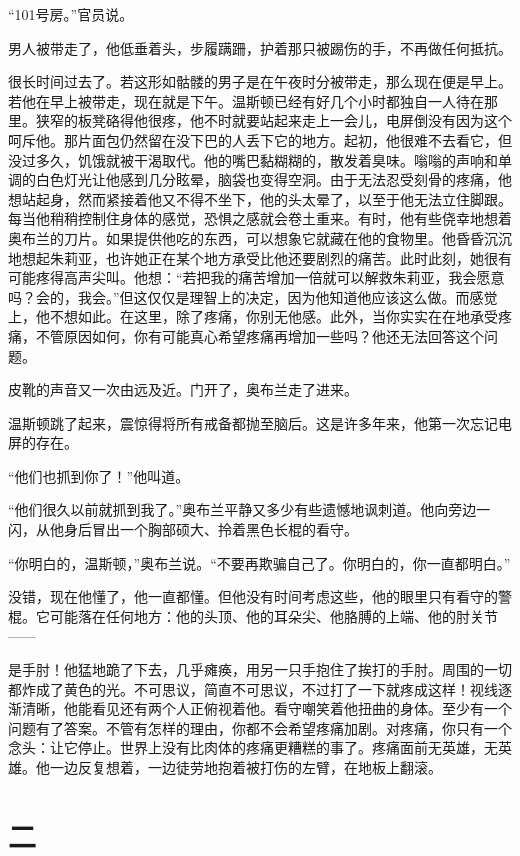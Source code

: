 ``101号房。''官员说。

男人被带走了，他低垂着头，步履蹒跚，护着那只被踢伤的手，不再做任何抵抗。

很长时间过去了。若这形如骷髅的男子是在午夜时分被带走，那么现在便是早上。若他在早上被带走，现在就是下午。温斯顿已经有好几个小时都独自一人待在那里。狭窄的板凳硌得他很疼，他不时就要站起来走上一会儿，电屏倒没有因为这个呵斥他。那片面包仍然留在没下巴的人丢下它的地方。起初，他很难不去看它，但没过多久，饥饿就被干渴取代。他的嘴巴黏糊糊的，散发着臭味。嗡嗡的声响和单调的白色灯光让他感到几分眩晕，脑袋也变得空洞。由于无法忍受刻骨的疼痛，他想站起身，然而紧接着他又不得不坐下，他的头太晕了，以至于他无法立住脚跟。每当他稍稍控制住身体的感觉，恐惧之感就会卷土重来。有时，他有些侥幸地想着奥布兰的刀片。如果提供他吃的东西，可以想象它就藏在他的食物里。他昏昏沉沉地想起朱莉亚，也许她正在某个地方承受比他还要剧烈的痛苦。此时此刻，她很有可能疼得高声尖叫。他想：``若把我的痛苦增加一倍就可以解救朱莉亚，我会愿意吗？会的，我会。''但这仅仅是理智上的决定，因为他知道他应该这么做。而感觉上，他不想如此。在这里，除了疼痛，你别无他感。此外，当你实实在在地承受疼痛，不管原因如何，你有可能真心希望疼痛再增加一些吗？他还无法回答这个问题。

皮靴的声音又一次由远及近。门开了，奥布兰走了进来。

温斯顿跳了起来，震惊得将所有戒备都抛至脑后。这是许多年来，他第一次忘记电屏的存在。

``他们也抓到你了！''他叫道。

``他们很久以前就抓到我了。''奥布兰平静又多少有些遗憾地讽刺道。他向旁边一闪，从他身后冒出一个胸部硕大、拎着黑色长棍的看守。

``你明白的，温斯顿，''奥布兰说。``不要再欺骗自己了。你明白的，你一直都明白。''

没错，现在他懂了，他一直都懂。但他没有时间考虑这些，他的眼里只有看守的警棍。它可能落在任何地方：他的头顶、他的耳朵尖、他胳膊的上端、他的肘关节——

是手肘！他猛地跪了下去，几乎瘫痪，用另一只手抱住了挨打的手肘。周围的一切都炸成了黄色的光。不可思议，简直不可思议，不过打了一下就疼成这样！视线逐渐清晰，他能看见还有两个人正俯视着他。看守嘲笑着他扭曲的身体。至少有一个问题有了答案。不管有怎样的理由，你都不会希望疼痛加剧。对疼痛，你只有一个念头：让它停止。世界上没有比肉体的疼痛更糟糕的事了。疼痛面前无英雄，无英雄。他一边反复想着，一边徒劳地抱着被打伤的左臂，在地板上翻滚。

\section*{二}\label{ux4e8cux5341}

